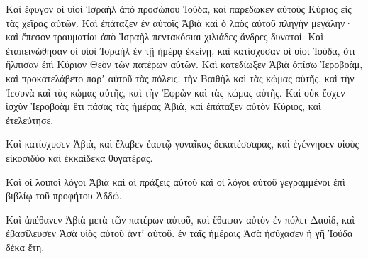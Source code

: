 {Καὶ ἔφυγον οἱ υἱοὶ Ἰσραὴλ ἀπὸ προσώπου Ἰούδα, καὶ παρέδωκεν αὐτοὺς Κύριος εἰς τὰς χεῖρας αὐτῶν.
Καὶ ἐπάταξεν ἐν αὐτοῖς Ἀβιὰ καὶ ὁ λαὸς αὐτοῦ πληγὴν μεγάλην· καὶ ἔπεσον τραυματίαι ἀπὸ Ἰσραὴλ πεντακόσιαι χιλιάδες ἄνδρες δυνατοί.
Καὶ ἐταπεινώθησαν οἱ υἱοὶ Ἰσραὴλ ἐν τῇ ἡμέρᾳ ἐκείνῃ, καὶ κατίσχυσαν οἱ υἱοὶ Ἰούδα, ὅτι ἤλπισαν ἐπὶ Κύριον Θεὸν τῶν πατέρων αὐτῶν.
Καὶ κατεδίωξεν Ἀβιὰ ὀπίσω Ἱεροβοὰμ, καὶ προκατελάβετο παρʼ αὐτοῦ τὰς πόλεις, τὴν Βαιθὴλ καὶ τὰς κώμας αὐτῆς, καὶ τὴν Ἰεσυνὰ καὶ τὰς κώμας αὐτῆς, καὶ τὴν Ἐφρὼν καὶ τὰς κώμας αὐτῆς.
Καὶ οὐκ ἔσχεν ἰσχὺν Ἱεροβοὰμ ἔτι πάσας τὰς ἡμέρας Ἀβιὰ, καὶ ἐπάταξεν αὐτὸν Κύριος, καὶ ἐτελεύτησε.
\par }{\PP {}Καὶ κατίσχυσεν Ἀβιὰ, καὶ ἔλαβεν ἑαυτῷ γυναῖκας δεκατέσσαρας, καὶ ἐγέννησεν υἱοὺς εἰκοσιδύο καὶ ἐκκαίδεκα θυγατέρας.
\par }{\PP {}Καὶ οἱ λοιποὶ λόγοι Ἀβιὰ καὶ αἱ πράξεις αὐτοῦ καὶ οἱ λόγοι αὐτοῦ γεγραμμένοι ἐπὶ βιβλίῳ τοῦ προφήτου Ἀδδώ.
\par }{\PP {}Καὶ ἀπέθανεν Ἀβιὰ μετὰ τῶν πατέρων αὐτοῦ, καὶ ἔθαψαν αὐτὸν ἐν πόλει Δαυὶδ, καὶ ἐβασίλευσεν Ἀσὰ υἱὸς αὐτοῦ ἀντʼ αὐτοῦ. ἐν ταῖς ἡμέραις Ἀσὰ ἡσύχασεν ἡ γῆ Ἰούδα δέκα ἔτη.

}

